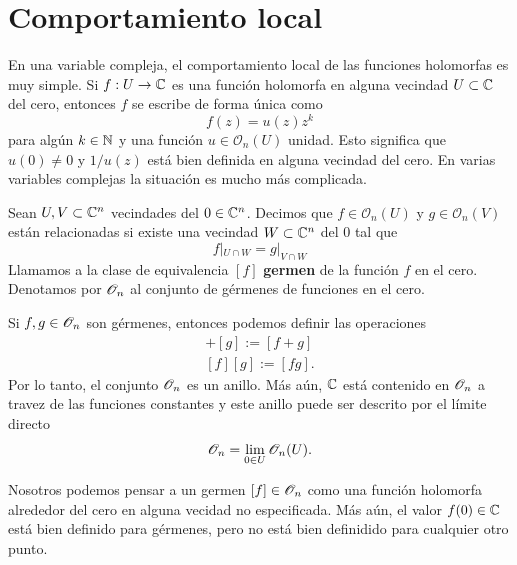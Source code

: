 \section{Comportamiento local}\label{complocal}

En una variable compleja, el comportamiento local de las funciones holomorfas es muy simple. Si $f:U\to\mathbb{C}$ es una función holomorfa en alguna vecindad $U\subset\mathbb{C}$ del cero, entonces $f$ se escribe de forma única como
\begin{equation*}
	f(z)=u(z)z^k
\end{equation*} 
para algún $k\in\mathbb{N}$ y una función $u\in\mathscr{O}_n(U)$ unidad. Esto significa que $u(0)\neq 0$ y $1/u(z)$ está bien definida en alguna vecindad del cero. En varias variables complejas la situación es mucho más complicada.\\
\begin{definition}
	Sean $U,V\subset \mathbb{C}^n$ vecindades del $0\in\mathbb{C}^n$. Decimos que $f\in\mathscr{O}_n(U)$ y $g\in\mathscr{O}_n(V)$ están relacionadas si existe una vecindad $W\subset\mathbb{C}^n$ del $0$ tal que
	\begin{equation*}
		f|_{U\cap W}=g|_{V\cap W}
	\end{equation*} 
	Llamamos a la clase de equivalencia $[f]$ \textbf{germen} de la función $f$ en el cero.
	Denotamos por $\mathscr{O}_{n}$ al conjunto de gérmenes de funciones en el cero.
\end{definition}

\begin{remark}
	Si $f,g\in \mathscr{O}_{n}$ son gérmenes, entonces podemos definir las operaciones
	\begin{align*}
		[f]+[g]:=[f+g]\\
		[f][g]:=[fg].
	\end{align*}
	Por lo tanto, el conjunto $\mathscr{O}_{n}$ es un anillo. Más aún, $\mathbb{C}$ está contenido en $\mathscr{O}_{n}$ a travez de las funciones constantes y este anillo puede ser descrito por el límite directo
	\begin{equation*}
		\mathscr{O}_{n}=\lim_{0\in U}\mathscr{O}_n(U).
	\end{equation*} 
\end{remark}

Nosotros podemos pensar a un germen $[f]\in\mathscr{O}_{n}$ como una función holomorfa alrededor del cero en alguna vecidad no especificada. Más aún, el valor $f(0)\in\mathbb{C}$ está bien definido para gérmenes, pero no está bien definidido para cualquier otro punto.\\

